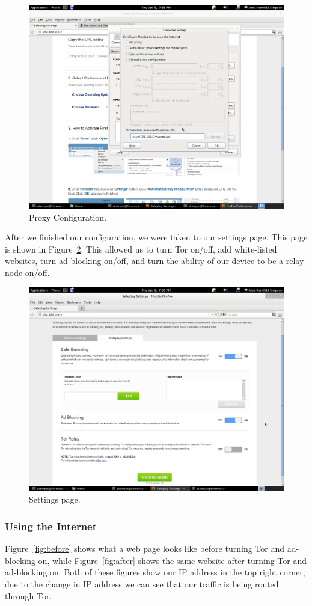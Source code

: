 \begin{figure}[t]
\begin{center}
\includegraphics[width=.75\textwidth]{proxyconfig}
\caption{Proxy Configuration.}
\label{fig:proxyconfig}
\end{center}
\end{figure}

After we finished our configuration, we were taken to our settings page.  This page is shown in Figure~\ref{fig:settings}.  This allowed us to turn Tor on/off, add white-listed websites, turn ad-blocking on/off, and turn the ability of our device to be a relay node on/off.  

\begin{figure}[htb]
\begin{center}
\includegraphics[width=.75\textwidth]{settings}
\caption{Settings page.}
\label{fig:settings}
\end{center}
\end{figure}

\subsubsection{Using the Internet} Figure~\ref{fig:before} shows what a web page looks like before turning Tor and ad-blocking on, while Figure~\ref{fig:after} shows the same website after turning Tor and ad-blocking on.  Both of these figures show our IP address in the top right corner; due to the change in IP address we can see that our traffic is being routed through Tor.  

